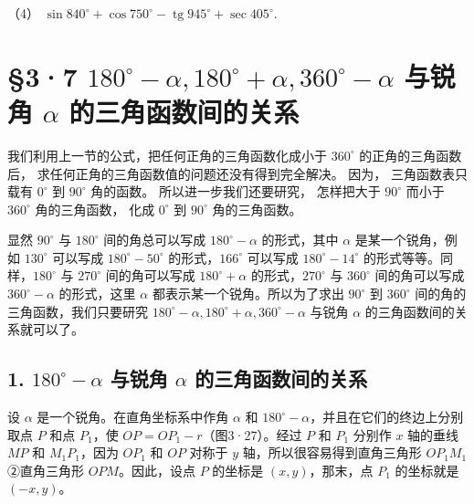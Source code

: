 （4）
\(\sin 840^{\circ} + \cos 750^{\circ} - \operatorname{tg} 945^{\circ} + \sec 405^{\circ}\).

\section{\texorpdfstring{§3·7 \(180^{\circ}-\alpha, 180^{\circ}+\alpha, 360^{\circ}-\alpha\) 与锐角 \(\alpha\) 的三角函数间的关系}{§3·7 180\^{}\{\textbackslash circ\}-\textbackslash alpha, 180\^{}\{\textbackslash circ\}+\textbackslash alpha, 360\^{}\{\textbackslash circ\}-\textbackslash alpha 与锐角 \textbackslash alpha 的三角函数间的关系}}\label{circ-alpha-180circalpha-360circ-alpha-ux4e0eux9510ux89d2-alpha-ux7684ux4e09ux89d2ux51fdux6570ux95f4ux7684ux5173ux7cfb}

我们利用上一节的公式，把任何正角的三角函数化成小于 \(360^{\circ}\)
的正角的三角函数后， 求任何正角的三角函数值的问题还没有得到完全解决。
因为， 三角函数表只载有 \(0^{\circ}\) 到 \(90^{\circ}\) 角的函数。
所以进一步我们还要研究， 怎样把大于 \(90^{\circ}\) 而小于
\(360^{\circ}\) 角的三角函数， 化成 \(0^{\circ}\) 到 \(90^{\circ}\)
角的三角函数。

显然 \(90^{\circ}\) 与 \(180^{\circ}\) 间的角总可以写成
\(180^{\circ} - \alpha\) 的形式，其中 \(\alpha\) 是某一个锐角，例如
\(130^{\circ}\) 可以写成 \(180^{\circ} - 50^{\circ}\)
的形式，\(166^{\circ}\) 可以写成 \(180^{\circ} - 14^{\circ}\)
的形式等等。同样，\(180^{\circ}\) 与 \(270^{\circ}\) 间的角可以写成
\(180^{\circ} + \alpha\) 的形式，\(270^{\circ}\) 与 \(360^{\circ}\)
间的角可以写成 \(360^{\circ} - \alpha\) 的形式，这里 \(\alpha\)
都表示某一个锐角。所以为了求出 \(90^{\circ}\) 到 \(360^{\circ}\)
间的角的三角函数，我们只要研究
\(180^{\circ} - \alpha, 180^{\circ} + \alpha, 360^{\circ} - \alpha\)
与锐角 \(\alpha\) 的三角函数间的关系就可以了。

\subsection{\texorpdfstring{1. \(180^{\circ} - \alpha\) 与锐角 \(\alpha\) 的三角函数间的关系}{1. 180\^{}\{\textbackslash circ\} - \textbackslash alpha 与锐角 \textbackslash alpha 的三角函数间的关系}}\label{circ---alpha-ux4e0eux9510ux89d2-alpha-ux7684ux4e09ux89d2ux51fdux6570ux95f4ux7684ux5173ux7cfb}

设 \(\alpha\) 是一个锐角。在直角坐标系中作角 \(\alpha\) 和
\(180^{\circ} - \alpha\)，并且在它们的终边上分别取点 \(P\) 和点
\(P_{1}\)，使 \(OP = OP_{1} - r\)（图3·27）。经过 \(P\) 和 \(P_{1}\)
分别作 \(x\) 轴的垂线 \(MP\) 和 \(M_{1}P_{1}\)，因为 \(OP_{1}\) 和
\(OP\) 对称于 \(y\) 轴，所以很容易得到直角三角形 \(OP_{1}M_{1}\)
②直角三角形 \(OPM\)。因此，设点 \(P\) 的坐标是 \((x, y)\)，那末，点
\(P_{1}\) 的坐标就是 \((-x, y)\)。

